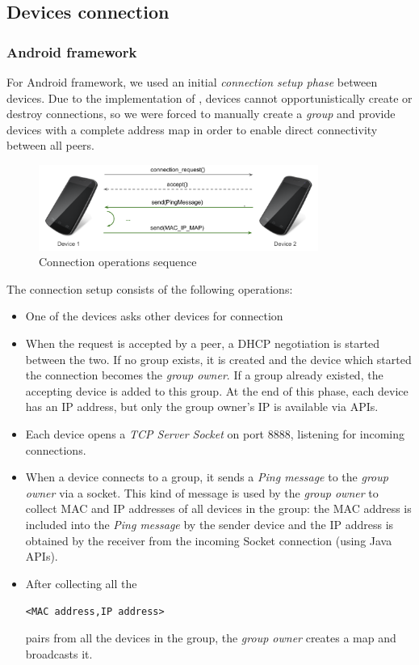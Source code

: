 \subsection{Devices connection}

\subsubsection{Android framework}
For Android framework, we used an initial \emph{connection setup phase} between devices.
Due to the implementation of \direct, devices cannot opportunistically create or destroy connections, so we were forced to manually create a \direct \textit{group} and provide devices with a complete address map in order to enable direct connectivity between all peers.

\begin{figure}[!htbp]
\centering
\includegraphics[width=3.6in]{imgs/device_connection_ops.pdf}
\caption{Connection operations sequence}
\label{fig:device_connection}
\end{figure}

The connection setup consists of the following operations:
	\begin{itemize}
		\item One of the devices asks other devices for connection
		\item When the request is accepted by a peer, a DHCP negotiation is started between the two. If no \direct group exists, it is created and the device which started the connection becomes the \textit{group owner}. If a group already existed, the accepting device is added to this group. At the end of this phase, each device has an IP address, but only the group owner's IP is available via \direct APIs. 
		\item Each device opens a \textit{TCP Server Socket} on port 8888, listening for incoming connections.
		\item When a device connects to a group, it sends a \textit{Ping message} to the \textit{group owner} via a socket. This kind of message is used by the \textit{group owner} to collect MAC and IP addresses of all devices in the group: the MAC address is included into the \emph{Ping message} by the sender device and the IP address is obtained by the receiver from the incoming Socket connection (using Java APIs).
		\item After collecting all the \begin{center}\tt{<MAC address,IP address>}\end{center} pairs from all the devices in the group, the \textit{group owner} creates a map and broadcasts it.
	\end{itemize}

